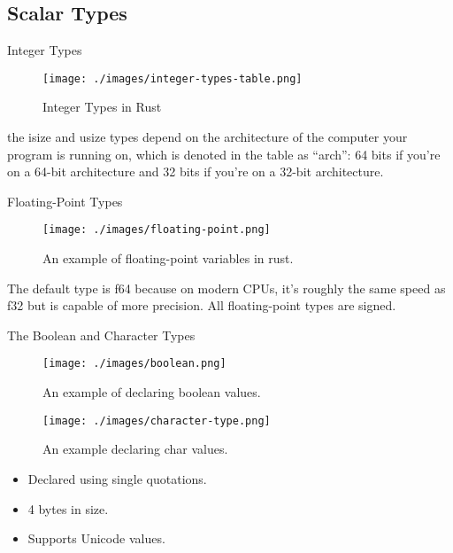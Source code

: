 \documentclass[10pt]{beamer}
\begin{document}
\subsection{Scalar Types}
\begin{frame}{Integer Types}
    \vspace*{-5mm}
    \begin{figure}[htpb]
        \centering
        \texttt{[image: ./images/integer-types-table.png]}
        \caption{Integer Types in Rust\cite{rust-book}}
    \end{figure}
    the isize and usize types depend on the architecture of the computer your program is running on, which is denoted in the table as “arch”: 64 bits if you’re on a 64-bit architecture and 32 bits if you’re on a 32-bit architecture.\cite{rust-book}
\end{frame}

\begin{frame}{Floating-Point Types}
    \begin{figure}[htpb]
        \centering
        \texttt{[image: ./images/floating-point.png]}
        \caption{An example of floating-point variables in rust.\cite{rust-book}}
    \end{figure}
    The default type is f64 because on modern CPUs, it’s roughly the same speed as f32 but is capable of more precision. All floating-point types are signed.\cite{rust-book}


\end{frame}

\begin{frame}{The Boolean and Character Types}
    \begin{figure}[htpb]
        \centering
        \texttt{[image: ./images/boolean.png]}
        \caption{An example of declaring boolean values.\cite{rust-book}}
    \end{figure}

    \vspace*{-5mm}
    \begin{figure}[htpb]
        \centering
        \texttt{[image: ./images/character-type.png]}
        \caption{An example declaring char values.\cite{rust-book}}
    \end{figure}

    \vspace*{-5mm}
    \begin{itemize}
        \item Declared using single quotations.
        \item 4 bytes in size.
        \item Supports Unicode values.
    \end{itemize}
\end{frame}
\end{document}
